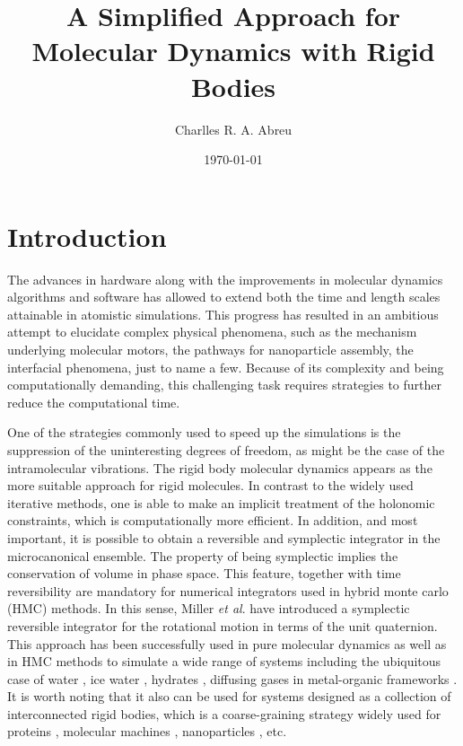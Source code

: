 \documentclass[aip,jcp,reprint,amsmath,amssymb]{revtex4-1}
\begin{document}
\title{A Simplified Approach for Molecular Dynamics with Rigid Bodies}

\author{Charlles R. A. Abreu}

\date{\today}

\maketitle

\section{Introduction}
The advances in hardware along with the improvements in molecular dynamics algorithms and software has allowed to extend both the time and length scales attainable in atomistic simulations. This progress has resulted in an ambitious attempt to elucidate complex physical phenomena, such as the mechanism underlying molecular motors, the pathways for nanoparticle assembly, the interfacial phenomena, just to name a few. Because of its complexity and being computationally demanding, this challenging task requires strategies to further reduce the computational time.

One of the strategies commonly used to speed up the simulations is the suppression of the uninteresting degrees of freedom, as might be the case of the intramolecular vibrations. The rigid body molecular dynamics appears as the more suitable approach for rigid molecules. In contrast to the widely used iterative methods,\cite{Ryckaert1977,Andersen1983} one is able to make an implicit treatment of the holonomic constraints, which is computationally more efficient. In addition, and most important, it is possible to obtain a reversible and symplectic integrator in the microcanonical ensemble. The property of being symplectic implies the conservation of volume in phase space. This feature, together with time reversibility are mandatory for numerical integrators used in hybrid monte carlo (HMC) methods.\cite{Duane1987} In this sense, Miller \textit{et al}.\cite{Miller2002} have introduced a symplectic reversible integrator for the rotational motion in terms of the unit quaternion. This approach has been successfully used in pure molecular dynamics as well as in HMC methods to simulate a wide range of systems including the ubiquitous case of water \cite{Sakamaki2011,Reinhardt2012,Palmer2014,Gonzales2014}, ice water \cite{Geiger2014}, hydrates \cite{Tribello2009,Gorman2012}, diffusing gases in metal-organic frameworks \citep{Ghoufi2010}. It is worth noting that it also can be used for systems designed as a collection of interconnected rigid bodies, which is a coarse-graining strategy widely used for proteins \citep{Terada2003}, molecular machines \citep{Akimov2008,Konyukhov2010}, nanoparticles \cite{Knorowski2012,Patra2013}, etc.
 
\end{document}
